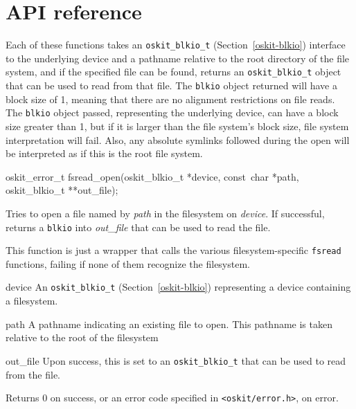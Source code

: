 \section{API reference}

Each of these functions takes an
\texttt{oskit_blkio_t} (Section~\ref{oskit-blkio})
interface to the underlying device
and a pathname relative to the root directory of the file system,
and if the specified file can be found,
returns an \texttt{oskit_blkio_t} object that can be used to
read from that file.
The \texttt{blkio} object returned will have a block size of 1,
meaning that there are no alignment restrictions on file reads.
The \texttt{blkio} object passed, representing the underlying device,
can have a block size greater than 1,
but if it is larger than the file system's block size,
file system interpretation will fail.
Also, any absolute symlinks followed during the open
will be interpreted as if this is the root file system.

\begin{apisyn}

	\funcproto oskit_error_t fsread_open(oskit_blkio_t *device,
				const~char *path,
				\outparam oskit_blkio_t **out_file);
\end{apisyn}
\begin{apidesc}
	Tries to open a file named by \emph{path} in the filesystem
	on \emph{device}.
	If successful, returns a \texttt{blkio} into \emph{out_file}
	that can be used to read the file.

	This function is just a wrapper that calls the various
	filesystem-specific \texttt{fsread} functions,
	failing if none of them recognize the filesystem.
\end{apidesc}
\begin{apiparm}
	\item[device]
		An \texttt{oskit_blkio_t} (Section~\ref{oskit-blkio})
		representing a device containing a filesystem.
	\item[path]
		A pathname indicating an existing file to open.
		This pathname is taken relative to the root of the filesystem
	\item[out_file]
		Upon success, this is set to an \texttt{oskit_blkio_t}
		that can be used to read from the file.
\end{apiparm}
\begin{apiret}
	Returns 0 on success, or an error code specified in
	{\tt <oskit/error.h>}, on error.
\end{apiret}

